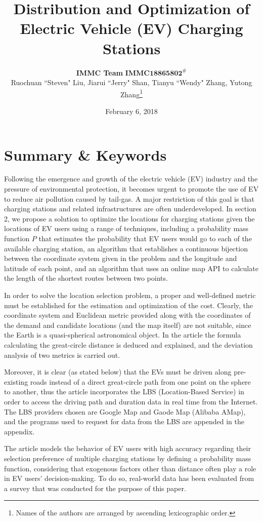 \documentclass[10pt]{article}
\title{Distribution and Optimization of Electric Vehicle (EV) Charging Stations}
\author{
\textbf{IMMC Team }$\mathbf{IMMC18865802^\#}$\\
Ruochuan ``Steven" Liu, Jiarui ``Jerry" Shan, Tianyu ``Wendy" Zhang, Yutong Zhang\footnote{Names of the authors are arranged by ascending lexicographic order.}
}
\date{February 6, 2018}
\begin{document}
\maketitle
\part{Summary \& Keywords}

Following the emergence and growth of the electric vehicle (EV) industry and the pressure of environmental protection, it becomes urgent to promote the use of EV to reduce air pollution caused by tail-gas. A major restriction of this goal is that charging stations and related infrastructures are often underdeveloped. In section 2, we propose a solution to optimize the locations for charging stations given the locations of EV users using a range of techniques, including a probability mass function $P$ that estimates the probability that EV users would go to each of the available charging station, an algorithm that establishes a continuous bijection between the coordinate system given in the problem and the longitude and latitude of each point, and an algorithm that uses an online map API to calculate the length of the shortest routes between two points.

In order to solve the location selection problem, a proper and well-defined metric must be established for the estimation and optimization of the cost. Clearly, the coordinate system and Euclidean metric provided along with the coordinates of the demand and candidate locations (and the map itself) are not suitable, since the Earth is a quasi-spherical astronomical object. In the article the formula calculating the great-circle distance is deduced and explained, and the deviation analysis of two metrics is carried out.

Moreover, it is clear (as stated below) that the EVs must be driven along pre-existing roads instead of a direct great-circle path from one point on the sphere to another, thus the article incorporates the LBS (Location-Based Service) in order to access the driving path and duration data in real time from the Internet. The LBS providers chosen are Google Map and Gaode Map (Alibaba AMap), and the programs used to request for data from the LBS are appended in the appendix.

The article models the behavior of EV users with high accuracy regarding their selection preference of multiple charging stations by defining a probability mass function, considering that exogenous factors other than distance often play a role in EV users' decision-making. To do so, real-world data has been evaluated from a survey that was conducted for the purpose of this paper.
\end{document}
